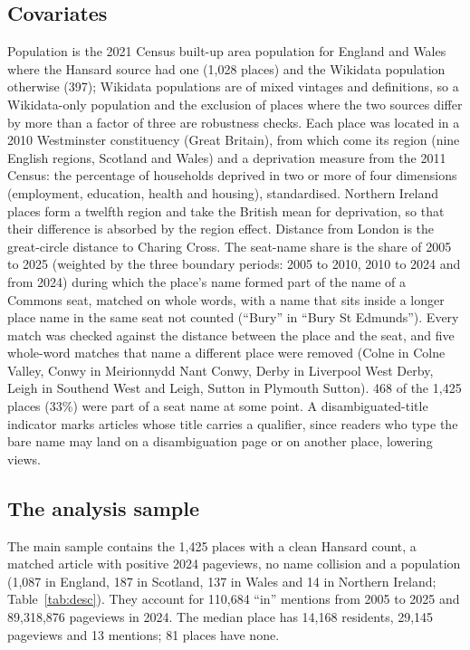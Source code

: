 \documentclass[11pt,a4paper]{article}
\begin{document}
\subsection{Covariates}
Population is the 2021 Census built-up area population for England and Wales where the Hansard source had one (1,028 places) and the Wikidata population otherwise (397); Wikidata populations are of mixed vintages and definitions, so a Wikidata-only population and the exclusion of places where the two sources differ by more than a factor of three are robustness checks. Each place was located in a 2010 Westminster constituency (Great Britain), from which come its region (nine English regions, Scotland and Wales) and a deprivation measure from the 2011 Census: the percentage of households deprived in two or more of four dimensions (employment, education, health and housing), standardised. Northern Ireland places form a twelfth region and take the British mean for deprivation, so that their difference is absorbed by the region effect. Distance from London is the great-circle distance to Charing Cross. The seat-name share is the share of 2005 to 2025 (weighted by the three boundary periods: 2005 to 2010, 2010 to 2024 and from 2024) during which the place's name formed part of the name of a Commons seat, matched on whole words, with a name that sits inside a longer place name in the same seat not counted (``Bury'' in ``Bury St Edmunds''). Every match was checked against the distance between the place and the seat, and five whole-word matches that name a different place were removed (Colne in Colne Valley, Conwy in Meirionnydd Nant Conwy, Derby in Liverpool West Derby, Leigh in Southend West and Leigh, Sutton in Plymouth Sutton). 468 of the 1,425 places (33\%) were part of a seat name at some point. A disambiguated-title indicator marks articles whose title carries a qualifier, since readers who type the bare name may land on a disambiguation page or on another place, lowering views.

\subsection{The analysis sample}
The main sample contains the 1,425 places with a clean Hansard count, a matched article with positive 2024 pageviews, no name collision and a population (1,087 in England, 187 in Scotland, 137 in Wales and 14 in Northern Ireland; Table~\ref{tab:desc}). They account for 110,684 ``in'' mentions from 2005 to 2025 and 89,318,876 pageviews in 2024. The median place has 14,168 residents, 29,145 pageviews and 13 mentions; 81 places have none.
\end{document}
